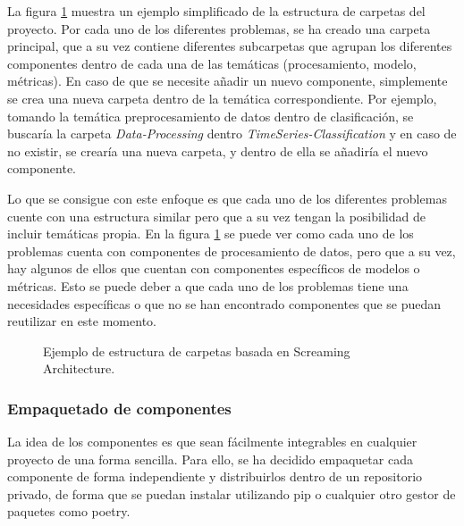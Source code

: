 La figura \ref{fig:screaming-arch} muestra un ejemplo simplificado de la estructura
de carpetas del proyecto. Por cada uno de los diferentes problemas, se ha creado una 
carpeta principal, que a su vez contiene diferentes subcarpetas que agrupan los 
diferentes componentes dentro de cada una de las temáticas (procesamiento, modelo, métricas). 
En caso de que se necesite añadir un nuevo componente, simplemente se crea una nueva
carpeta dentro de la temática correspondiente. Por ejemplo, tomando la temática preprocesamiento de datos
dentro de clasificación, se buscaría la carpeta \textit{Data-Processing} dentro
\textit{TimeSeries-Classification} y en caso de no existir, se crearía una nueva carpeta, y dentro de ella 
se añadiría el nuevo componente. \medskip

Lo que se consigue con este enfoque es que cada uno de los diferentes problemas cuente con una 
estructura similar pero que a su vez tengan la posibilidad de incluir temáticas propia. En la
figura \ref{fig:screaming-arch} se puede ver como cada uno de los problemas cuenta con componentes
de procesamiento de datos, pero que a su vez, hay algunos de ellos que cuentan con componentes
específicos de modelos o métricas. Esto se puede deber a que cada uno de los problemas tiene
una necesidades específicas o que no se han encontrado componentes que se puedan reutilizar
en este momento.

\begin{figure}[ht]
    \caption{Ejemplo de estructura de carpetas basada en Screaming Architecture.}
    \label{fig:screaming-arch}
\end{figure}

\subsubsection{Empaquetado de componentes}
La idea de los componentes es que sean fácilmente integrables en cualquier
proyecto de una forma sencilla. Para ello, se ha decidido empaquetar cada
componente de forma independiente y distribuirlos dentro de un repositorio
privado, de forma que se puedan instalar utilizando pip o cualquier otro 
gestor de paquetes como poetry.\medskip

